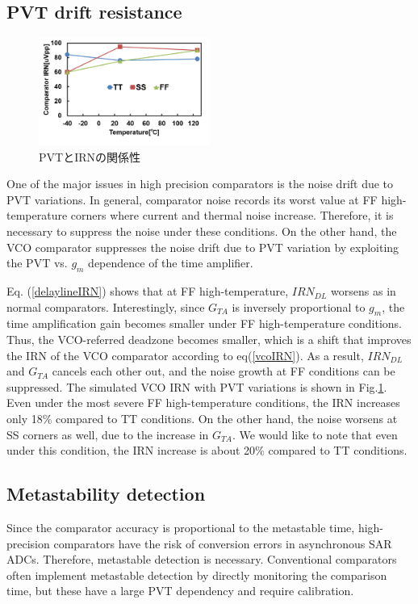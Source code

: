 \documentclass[letterpaper, 10 pt, conference]{ieeeconf}  %
\begin{document}
\subsection{PVT drift resistance}
\begin{figure}[ht!]
\centering
 \includegraphics[width=0.5\textwidth]{figs/pvt_vco.png}
  \captionsetup{font=footnotesize}
  \caption{PVTとIRNの関係性}
  \label{pvtvco}
\end{figure}

One of the major issues in high precision comparators is the noise drift due to PVT variations. In general, comparator noise records its worst value at  FF high-temperature corners where current and thermal noise increase. Therefore, it is necessary to suppress the noise under these conditions. On the other hand, the VCO comparator suppresses the noise drift due to PVT variation by exploiting the PVT vs. $g_m$ dependence of the time amplifier.

Eq. (\ref{delaylineIRN}) shows that at FF high-temperature, $IRN_{DL}$ worsens as in normal comparators.
Interestingly, since $G_{TA}$ is inversely proportional to $g_m$, the time amplification gain becomes smaller under FF high-temperature conditions. Thus, the VCO-referred deadzone becomes smaller, which is a shift that improves the IRN of the VCO comparator according to eq(\ref{vcoIRN}). As a result, $IRN_{DL}$ and $G_{TA}$ cancels each other out, and the noise growth at FF conditions can be suppressed. The simulated VCO IRN with PVT variations is shown in Fig.\ref{pvtvco}. Even under the most severe FF high-temperature conditions, the IRN increases only 18\% compared to TT conditions. On the other hand, the noise worsens at SS corners as well, due to the increase in $G_{TA}$. We would like to note that even under this condition, the IRN increase is about 20\% compared to TT conditions.

\subsection{Metastability detection}
Since the comparator accuracy is proportional to the metastable time, high-precision comparators have the risk of conversion errors in asynchronous SAR ADCs. Therefore, metastable detection is necessary.
Conventional comparators often implement metastable detection by directly monitoring the comparison time, but these have a large PVT dependency and require calibration\cite{shikata20120}.
\end{document}
